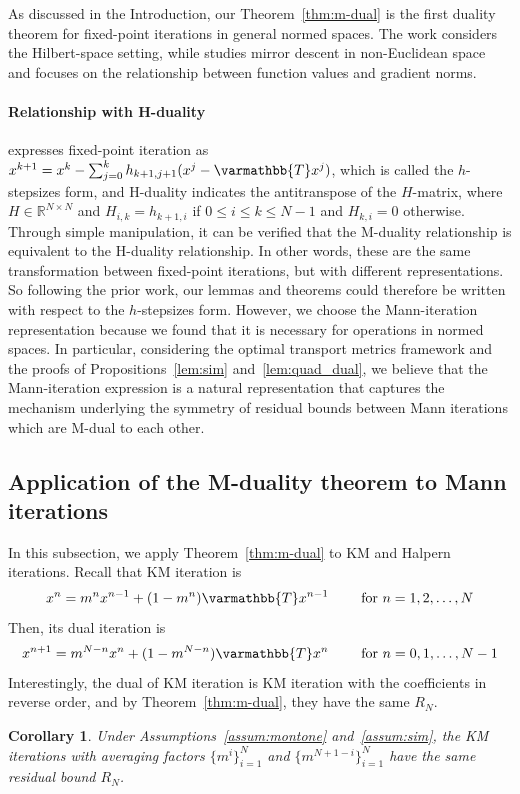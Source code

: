 \documentclass[pdflatex,sn-mathphys-num]{sn-jnl}%
\newcommand{\real}{\mathbb{R}}
\newcommand{\opT}{{\varmathbb{T}}}
\theoremstyle{thmstyleone}%
\theoremstyle{thmstyletwo}%
\theoremstyle{thmstylethree}%
\newtheorem{corollary}{Corollary}
\begin{document}
As discussed in the Introduction, our Theorem~\ref{thm:m-dual} is the first duality theorem for fixed-point iterations in general normed spaces. The work \cite{yoon2024optimal} considers the Hilbert-space setting, while \cite{kim2023mirror} studies mirror descent in non-Euclidean space and focuses on the relationship between function values and gradient norms. 

 
\paragraph{Relationship with H-duality}
  \cite{yoon2024optimal} expresses fixed-point iteration as
$x^{k+1} = x^k-\sum^k_{j=0} h_{k+1,j+1}(x^j-\opT x^j)$,
which is called the $h$-stepsizes form, and H-duality indicates the antitranspose of the $H$-matrix, where $H \in \real^{N\times N}$ and $H_{i,k}=h_{k+1,i}$ if $0 \le i \le k \le N-1$ and $H_{k,i}=0$ otherwise. Through simple manipulation, it can be verified that the M-duality relationship is equivalent to the H-duality relationship. In other words, these are the same transformation between fixed-point iterations, but with different representations. So following the prior work, our lemmas and theorems could therefore be written with respect to the $h$-stepsizes form. However, we choose the Mann-iteration representation because we found that it is necessary for operations in normed spaces. In particular, considering the optimal transport metrics framework and the proofs of Propositions~\ref{lem:sim} and~\ref{lem:quad_dual}, we believe that the Mann-iteration expression is a natural representation that captures the mechanism underlying the symmetry of residual bounds between Mann iterations which are M-dual to each other.


\subsection{Application of the M-duality theorem to Mann iterations}
In this subsection, we apply Theorem~\ref{thm:m-dual} to KM and Halpern iterations. Recall that KM iteration is
\[ x^{n}=m^n x^{n-1}+ (1-m^{n}) \opT x^{n-1}
\qquad\text{ for } n=1,2,\dots,N\]
Then, its dual iteration is
\[ x^{n+1}=m^{N-n} x^{n}+ (1-m^{N-n}) \opT x^{n}
\qquad\text{ for } n=0,1,\dots,N-1\]
Interestingly, the dual of KM iteration is KM iteration with the coefficients in reverse order, and by Theorem~\ref{thm:m-dual}, they have the same $R_N$.
\begin{corollary}
       Under Assumptions~\ref{assum:montone} and~\ref{assum:sim}, the KM iterations with averaging factors $\{m^i\}^N_{i=1}$ and $\{m^{N+1-i}\}^N_{i=1}$ have the same residual bound $R_N$.
\end{corollary}
\end{document}
